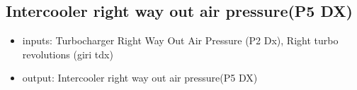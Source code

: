 

\subsection{Intercooler right way out air pressure(P5 DX)}
\begin{itemize}
	\item{inputs: Turbocharger Right Way Out Air Pressure (P2 Dx), Right turbo revolutions (giri tdx)}
	\item{output: Intercooler right way out air pressure(P5 DX)}
\end{itemize}	

